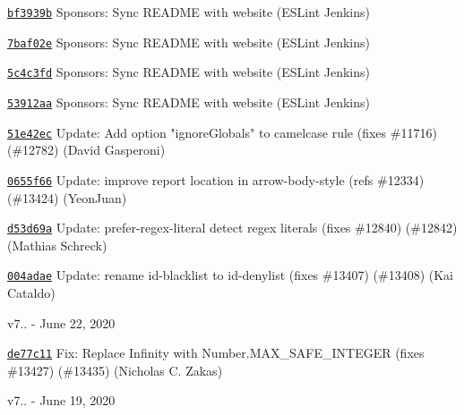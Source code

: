 \begin{DoxyItemize}
\item \href{https://github.com/eslint/eslint/commit/bf3939bbd9a33d0eb96cebe6a53bf61c855f9ba6}{\texttt{ {\ttfamily bf3939b}}} Sponsors\+: Sync README with website (ESLint Jenkins)
\item \href{https://github.com/eslint/eslint/commit/7baf02e983af909800261263f125cca901a5bd0f}{\texttt{ {\ttfamily 7baf02e}}} Sponsors\+: Sync README with website (ESLint Jenkins)
\item \href{https://github.com/eslint/eslint/commit/5c4c3fdfbda18a13223ad36f44283adbfee8c496}{\texttt{ {\ttfamily 5c4c3fd}}} Sponsors\+: Sync README with website (ESLint Jenkins)
\item \href{https://github.com/eslint/eslint/commit/53912aab1856327b399cca26cbb2ba81fd01bfa2}{\texttt{ {\ttfamily 53912aa}}} Sponsors\+: Sync README with website (ESLint Jenkins)
\item \href{https://github.com/eslint/eslint/commit/51e42eca3e87d8259815d736ffe81e604f184057}{\texttt{ {\ttfamily 51e42ec}}} Update\+: Add option "{}ignore\+Globals"{} to camelcase rule (fixes \#11716) (\#12782) (David Gasperoni)
\item \href{https://github.com/eslint/eslint/commit/0655f66525d167ca1288167b79a77087cfc8fcf6}{\texttt{ {\ttfamily 0655f66}}} Update\+: improve report location in arrow-\/body-\/style (refs \#12334) (\#13424) (Yeon\+Juan)
\item \href{https://github.com/eslint/eslint/commit/d53d69af08cfe55f42e0a0ca725b1014dabccc21}{\texttt{ {\ttfamily d53d69a}}} Update\+: prefer-\/regex-\/literal detect regex literals (fixes \#12840) (\#12842) (Mathias Schreck)
\item \href{https://github.com/eslint/eslint/commit/004adae3f959414f56e44e5884f6221e9dcda142}{\texttt{ {\ttfamily 004adae}}} Update\+: rename id-\/blacklist to id-\/denylist (fixes \#13407) (\#13408) (Kai Cataldo)
\end{DoxyItemize}

v7.. -\/ June 22, 2020


\begin{DoxyItemize}
\item \href{https://github.com/eslint/eslint/commit/de77c11e7515f2097ff355ddc0d7b6db9c83c892}{\texttt{ {\ttfamily de77c11}}} Fix\+: Replace Infinity with Number.\+MAX\+\_\+\+SAFE\+\_\+\+INTEGER (fixes \#13427) (\#13435) (Nicholas C. Zakas)
\end{DoxyItemize}

v7.. -\/ June 19, 2020


